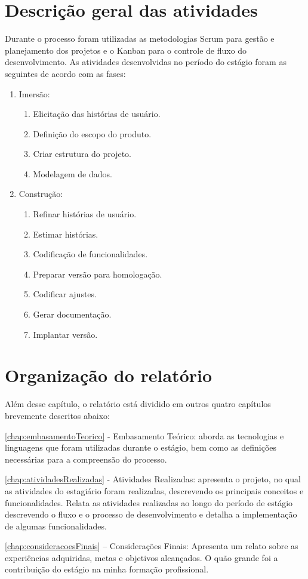 \section{Descrição geral das atividades}
\label{sec:descricaoGeralAtividades}
Durante o processo foram utilizadas as metodologias Scrum para gestão e planejamento dos projetos e o Kanban para o controle de fluxo do desenvolvimento. As atividades desenvolvidas no período do estágio foram as seguintes de acordo com as fases: 
\begin{enumerate}
    \item Imersão:
    \begin{enumerate}
        \item Elicitação das histórias de usuário.
        \item Definição do escopo do produto.
        \item Criar estrutura do projeto.
        \item Modelagem de dados.
    \end{enumerate}
   \item Construção:
   \begin{enumerate}
        \item Refinar histórias de usuário.
        \item Estimar histórias.
        \item Codificação de funcionalidades.
        \item Preparar versão para homologação.
        \item Codificar ajustes.
        \item Gerar documentação.
        \item Implantar versão.
   \end{enumerate}
\end{enumerate}

\section{Organização do relatório}
\label{sec:organizacaoRelatorio}
Além desse capítulo, o relatório está dividido em outros quatro capítulos brevemente descritos abaixo:

\autoref{chap:embasamentoTeorico} - Embasamento Teórico: aborda as tecnologias e linguagens que foram utilizadas durante o estágio, bem como as definições necessárias para a compreensão do processo.

\autoref{chap:atividadesRealizadas} - Atividades Realizadas: apresenta o projeto, no qual as atividades do estagiário foram realizadas, descrevendo os principais conceitos e funcionalidades. Relata as atividades realizadas ao longo do período de estágio descrevendo o fluxo e o processo de desenvolvimento e detalha a implementação de algumas funcionalidades.

\autoref{chap:consideracoesFinais} – Considerações Finais: Apresenta um relato sobre as experiências adquiridas, metas e objetivos alcançados. O quão grande foi a contribuição do estágio na minha formação profissional.
